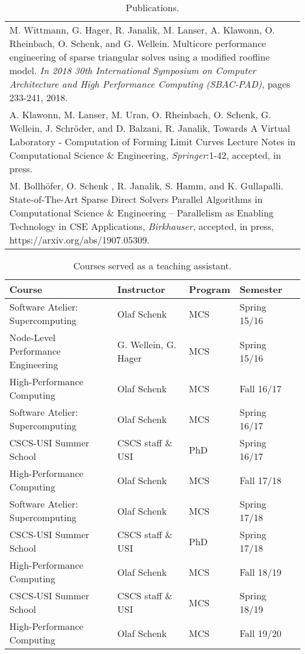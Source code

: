 \begin{table}
\caption{Publications.}
\label{tab:publications}
   \begin{tabular}{m{\textwidth}}
M. Wittmann, G. Hager, R. Janalik, M. Lanser, A. Klawonn, O. Rheinbach, O. Schenk, and G. Wellein. Multicore performance engineering of sparse triangular solves using a modified roofline model. \textit{In 2018 30th International Symposium on Computer Architecture and High Performance Computing (SBAC-PAD)}, pages 233-241, 2018.
\vspace{0.5em} \\
A. Klawonn, M. Lanser, M. Uran, O. Rheinbach, O. Schenk, G. Wellein, J. Schr\"oder, and D. Balzani, R. Janalik,
Towards A Virtual Laboratory - Computation of Forming Limit Curves
   Lecture Notes in Computational Science \& Engineering, \textit{Springer}:1-42, accepted, in press.
\vspace{0.5em} \\
M. Bollh\"ofer, O. Schenk , R. Janalik, S. Hamm, and K. Gullapalli.
State-of-The-Art Sparse Direct Solvers
Parallel Algorithms in Computational Science \& Engineering -- Parallelism as Enabling Technology in CSE Applications, \textit{Birkhauser}, accepted, in press, https://arxiv.org/abs/1907.05309.
\vspace{0.2em} \\
\hline
   \end{tabular}
\end{table}

\begin{table}[h!]
\centering
\caption{Courses served as a teaching assistant.}
\label{tab:ta}
\begin{tabular}{lllll}
\hline
Course                               & Instructor             & Program & Semester  \\ \hline
Software Atelier: Supercomputing & Olaf Schenk & MCS & Spring 15/16 \\
Node-Level Performance Engineering & G. Wellein, G. Hager & MCS & Spring 15/16 \\
High-Performance Computing & Olaf Schenk & MCS & Fall 16/17 \\
Software Atelier: Supercomputing & Olaf Schenk & MCS & Spring 16/17 \\
CSCS-USI Summer School & CSCS staff \& USI & PhD & Spring 16/17 \\
High-Performance Computing & Olaf Schenk & MCS & Fall 17/18 \\
Software Atelier: Supercomputing & Olaf Schenk & MCS & Spring 17/18 \\
CSCS-USI Summer School & CSCS staff \& USI & PhD & Spring 17/18 \\
High-Performance Computing & Olaf Schenk & MCS & Fall 18/19 \\
CSCS-USI Summer School & CSCS staff \& USI & MCS & Spring 18/19 \\
High-Performance Computing & Olaf Schenk & MCS & Fall 19/20	\\ \hline
 \hline
\end{tabular}
\end{table}


